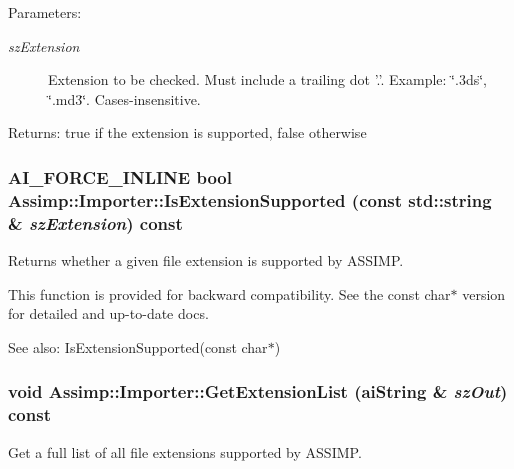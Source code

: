 \begin{Desc}
\item[Parameters:]
\begin{description}
\item[{\em szExtension}]Extension to be checked. Must include a trailing dot '.'. Example: \char`\"{}.3ds\char`\"{}, \char`\"{}.md3\char`\"{}. Cases-insensitive. \end{description}
\end{Desc}
\begin{Desc}
\item[Returns:]true if the extension is supported, false otherwise \end{Desc}
\hypertarget{class_assimp_1_1_importer_5b01905366f5bf8d1f89d51f755bf7d2}{
\subsubsection[IsExtensionSupported]{\setlength{\rightskip}{0pt plus 5cm}AI\_\-FORCE\_\-INLINE bool Assimp::Importer::IsExtensionSupported (const std::string \& {\em szExtension}) const}}
\label{class_assimp_1_1_importer_5b01905366f5bf8d1f89d51f755bf7d2}


Returns whether a given file extension is supported by ASSIMP. 

This function is provided for backward compatibility. See the const char$\ast$ version for detailed and up-to-date docs. \begin{Desc}
\item[See also:]IsExtensionSupported(const char$\ast$) \end{Desc}
\hypertarget{class_assimp_1_1_importer_23c85647f7977012d9fef20b36c2d579}{
\subsubsection[GetExtensionList]{\setlength{\rightskip}{0pt plus 5cm}void Assimp::Importer::GetExtensionList ({\bf aiString} \& {\em szOut}) const}}
\label{class_assimp_1_1_importer_23c85647f7977012d9fef20b36c2d579}


Get a full list of all file extensions supported by ASSIMP.

